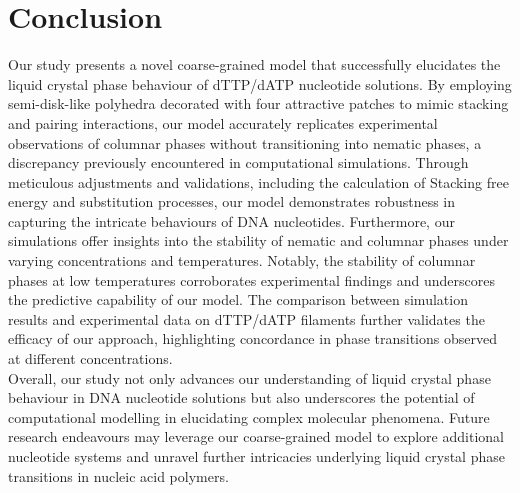 \documentclass[aip,jcp, amsmath, amssymb, reprint]{revtex4-1}
\begin{document}
\section{\label{Dis}Conclusion}

Our study presents a novel coarse-grained model that successfully elucidates the liquid crystal phase behaviour of dTTP/dATP nucleotide solutions. By employing semi-disk-like polyhedra decorated with four attractive patches to mimic stacking and pairing interactions, our model accurately replicates experimental observations of columnar phases without transitioning into nematic phases, a discrepancy previously encountered in computational simulations. Through meticulous adjustments and validations, including the calculation of Stacking free energy and substitution processes, our model demonstrates robustness in capturing the intricate behaviours of DNA nucleotides. Furthermore, our simulations offer insights into the stability of nematic and columnar phases under varying concentrations and temperatures. Notably, the stability of columnar phases at low temperatures corroborates experimental findings and underscores the predictive capability of our model. The comparison between simulation results and experimental data on dTTP/dATP filaments further validates the efficacy of our approach, highlighting concordance in phase transitions observed at different concentrations. \\

Overall, our study not only advances our understanding of liquid crystal phase behaviour in DNA nucleotide solutions but also underscores the potential of computational modelling in elucidating complex molecular phenomena. Future research endeavours may leverage our coarse-grained model to explore additional nucleotide systems and unravel further intricacies underlying liquid crystal phase transitions in nucleic acid polymers.



\end{document}
